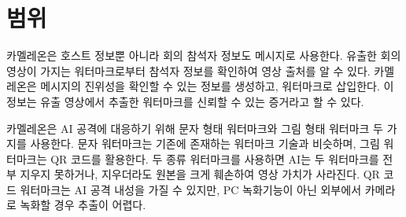 \section{범위}

카멜레온은 호스트 정보뿐 아니라 회의 참석자 정보도 메시지로 사용한다. 유출한
회의영상이 가지는 워터마크로부터 참석자 정보를 확인하여 영상 출처를 알 수 있다.
카멜레온은 메시지의 진위성을 확인할 수 있는 정보를 생성하고, 워터마크로
삽입한다. 이 정보는 유출 영상에서 추출한 워터마크를 신뢰할 수 있는 증거라고 할
수 있다.

카멜레온은 AI 공격에 대응하기 위해 문자 형태 워터마크와 그림 형태 워터마크 두
가지를 사용한다. 문자 워터마크는 기존에 존재하는 워터마크 기술과 비슷하며, 그림
워터마크는 QR 코드를 활용한다. 두 종류 워터마크를 사용하면 AI는 두 워터마크를
전부 지우지 못하거나, 지우더라도 원본을 크게 훼손하여 영상 가치가 사라진다.
QR 코드 워터마크는 AI 공격 내성을 가질 수 있지만, PC 녹화기능이 아닌 외부에서
카메라로 녹화할 경우 추출이 어렵다.